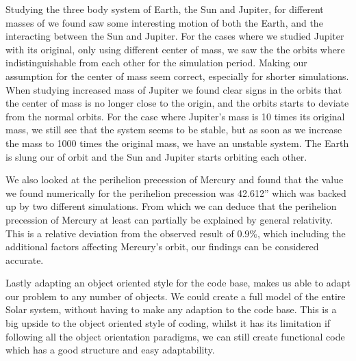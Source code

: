 \documentclass[%
reprint,
nofootinbib,
amsmath,amssymb,
aps,
]{revtex4-1}
\begin{document}
Studying the three body system of Earth, the Sun and Jupiter, for different masses of we found saw some interesting motion of both the Earth, and the interacting between the Sun and Jupiter. 
For the cases where we studied Jupiter with its original, only using different center of mass, we saw the the orbits where indistinguishable from each other for the simulation period. Making our assumption for the center of mass seem correct, especially for shorter simulations. 
When studying increased mass of Jupiter we found clear signs in the orbits that the center of mass is no longer close to the origin, and the orbits starts to deviate from the normal orbits. For the case where Jupiter's mass is 10 times its original mass, we still see that the system seems to be stable, but as soon as we increase the mass to 1000 times the original mass, we have an unstable system. The Earth is slung our of orbit and the Sun and Jupiter starts orbiting each other. 

We also looked at the perihelion precession of Mercury and found that the value we found numerically for the perihelion precession was 42.612'' which was backed up by two different simulations. From which we can deduce that the perihelion precession of Mercury at least can partially be explained by general relativity. This is a relative deviation from the observed result of $0.9\%$, which including the additional factors affecting Mercury's orbit, our findings can be considered accurate. 

Lastly adapting an object oriented style for the code base, makes us able to adapt our problem to any number of objects. We could create a full model of the entire Solar system, without having to make any adaption to the code base. This is a big upside to the object oriented style of coding, whilst it has its limitation if following all the object orientation paradigms, we can still create functional code which has a good structure and easy adaptability.



\end{document}
